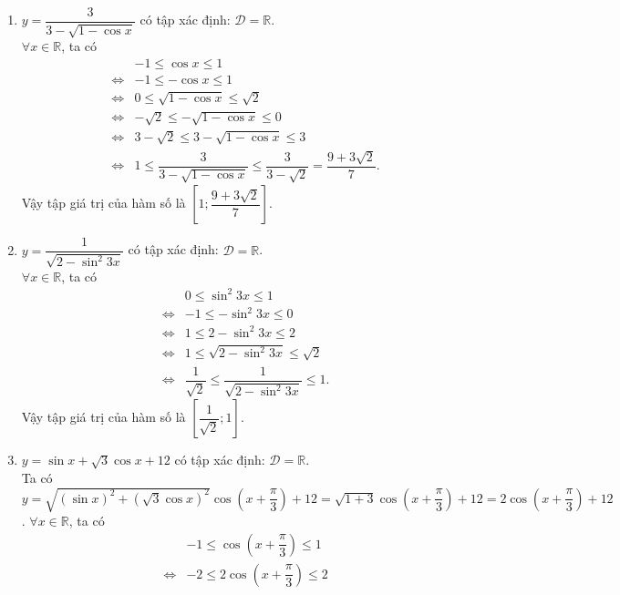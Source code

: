 \begin{bt}
{\begin{enumerate}
\begin{eqnarray*}
			&\Leftrightarrow& 2 \leq 3-\cos ^{2} x \leq 3\\
			&\Leftrightarrow& \dfrac{8}{3} \leq \dfrac{8}{3-\cos ^{2} x} \leq 4.
		\end{eqnarray*}
		Vậy tập giá trị của hàm số là $\left[\dfrac{8}{3};4\right]$.
		\item $y=\dfrac{3}{3-\sqrt{1-\cos x}}$ có tập xác định: $\mathscr{D}=\mathbb{R}$.\\
		$\forall x \in \mathbb{R}$, ta có
		\begin{eqnarray*}
			& &-1\leq \cos x\leq 1\\
			&\Leftrightarrow&-1\leq -\cos x\leq 1\\
			&\Leftrightarrow&0\leq \sqrt{1-\cos x}\leq \sqrt{2}\\
			&\Leftrightarrow&-\sqrt{2}\leq -\sqrt{1-\cos x}\leq 0\\
			&\Leftrightarrow&3-\sqrt{2}\leq 3 -\sqrt{1-\cos x}\leq 3\\
			&\Leftrightarrow&1\leq \dfrac{3}{3-\sqrt{1-\cos x}}\leq \dfrac{3}{3-\sqrt{2}}=\dfrac{9+3\sqrt{2}}{7}.
		\end{eqnarray*}
		Vậy tập giá trị của hàm số là $\left[1;\dfrac{9+3\sqrt{2}}{7}\right]$.
		\item $y=\dfrac{1}{\sqrt{2-\sin ^{2} 3 x}}$ có tập xác định: $\mathscr{D}=\mathbb{R}$.\\
		$\forall x \in \mathbb{R}$, ta có
		\begin{eqnarray*}
			& & 0\leq \sin^2 3x\leq 1\\
			&\Leftrightarrow& -1\leq -\sin^2 3x\leq 0\\
			&\Leftrightarrow&1\leq 2-\sin^2 3x\leq 2\\
			&\Leftrightarrow&1\leq \sqrt{2-\sin^2 3x}\leq \sqrt{2}\\
			&\Leftrightarrow&\dfrac{1}{\sqrt{2}}\leq \dfrac{1}{\sqrt{2-\sin^2 3x}}\leq 1.
		\end{eqnarray*}
		Vậy tập giá trị của hàm số là $\left[\dfrac{1}{\sqrt{2}};1\right]$.
		\item $y=\sin x+\sqrt{3} \cos x+12$ có tập xác định: $\mathscr{D}=\mathbb{R}$.\\
		Ta có $y=\sqrt{(\sin x)^{2}+(\sqrt{3} \cos x)^{2}} \cos \left(x+\dfrac{\pi}{3}\right)+12=\sqrt{1+3} \cos \left(x+\dfrac{\pi}{3}\right)+12=2\cos \left(x+\dfrac{\pi}{3}\right)+12$.
		$\forall x \in \mathbb{R}$, ta có
		\begin{eqnarray*}
			&&-1 \leq \cos \left(x+\dfrac{\pi}{3}\right) \leq 1\\
			&\Leftrightarrow& -2 \leq 2\cos \left(x+\dfrac{\pi}{3}\right) \leq 2\\

\end{eqnarray*}
\end{enumerate}}
\end{bt}
